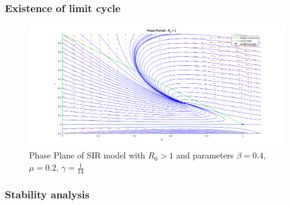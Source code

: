 \subsubsection{Existence of limit cycle}


\begin{figure}[h!]
    \centering
    \includegraphics[scale=0.45]{Figure/pp_R0_major_1.png}
    \caption{Phase Plane of SIR model with $R_0 > 1$ and parameters $\beta = 0.4$, $\mu = 0.2$, $\gamma=\frac{1}{14}$}
    \label{fig:phase_plane_r0_major_1}
\end{figure}

\subsubsection{Stability analysis}


